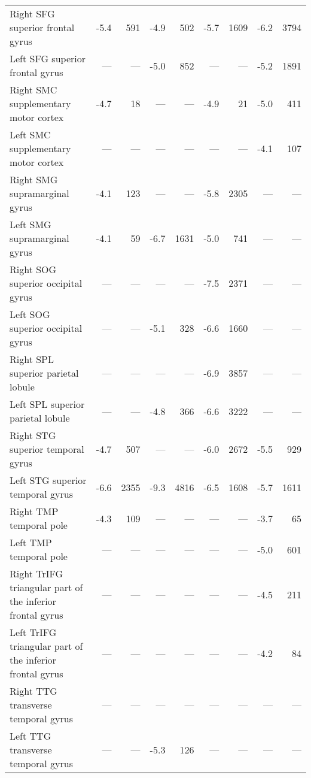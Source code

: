 \documentclass[]{article}
\begin{document}
\begin{table}[ht]
{\begin{tabular}{lrrrrrrrr}
  Right SFG   superior frontal gyrus & -5.4 & 591 & -4.9 & 502 & -5.7 & 1609 & -6.2 & 3794 \\ 
  Left SFG   superior frontal gyrus & --- & --- & -5.0 & 852 & --- & --- & -5.2 & 1891 \\ 
  Right SMC   supplementary motor cortex & -4.7 & 18 & --- & --- & -4.9 & 21 & -5.0 & 411 \\ 
  Left SMC   supplementary motor cortex & --- & --- & --- & --- & --- & --- & -4.1 & 107 \\ 
  Right SMG   supramarginal gyrus & -4.1 & 123 & --- & --- & -5.8 & 2305 & --- & --- \\ 
  Left SMG   supramarginal gyrus & -4.1 & 59 & -6.7 & 1631 & -5.0 & 741 & --- & --- \\ 
  Right SOG   superior occipital gyrus & --- & --- & --- & --- & -7.5 & 2371 & --- & --- \\ 
  Left SOG   superior occipital gyrus & --- & --- & -5.1 & 328 & -6.6 & 1660 & --- & --- \\ 
  Right SPL   superior parietal lobule & --- & --- & --- & --- & -6.9 & 3857 & --- & --- \\ 
  Left SPL   superior parietal lobule & --- & --- & -4.8 & 366 & -6.6 & 3222 & --- & --- \\ 
  Right STG   superior temporal gyrus & -4.7 & 507 & --- & --- & -6.0 & 2672 & -5.5 & 929 \\ 
  Left STG   superior temporal gyrus & -6.6 & 2355 & -9.3 & 4816 & -6.5 & 1608 & -5.7 & 1611 \\ 
  Right TMP   temporal pole & -4.3 & 109 & --- & --- & --- & --- & -3.7 & 65 \\ 
  Left TMP   temporal pole & --- & --- & --- & --- & --- & --- & -5.0 & 601 \\ 
  Right TrIFG triangular part of the inferior frontal gyrus & --- & --- & --- & --- & --- & --- & -4.5 & 211 \\ 
  Left TrIFG triangular part of the inferior frontal gyrus & --- & --- & --- & --- & --- & --- & -4.2 & 84 \\ 
  Right TTG   transverse temporal gyrus & --- & --- & --- & --- & --- & --- & --- & --- \\ 
  Left TTG   transverse temporal gyrus & --- & --- & -5.3 & 126 & --- & --- & --- & --- \\ 
   \hline
\end{tabular}
}
\end{table}
\end{document}
